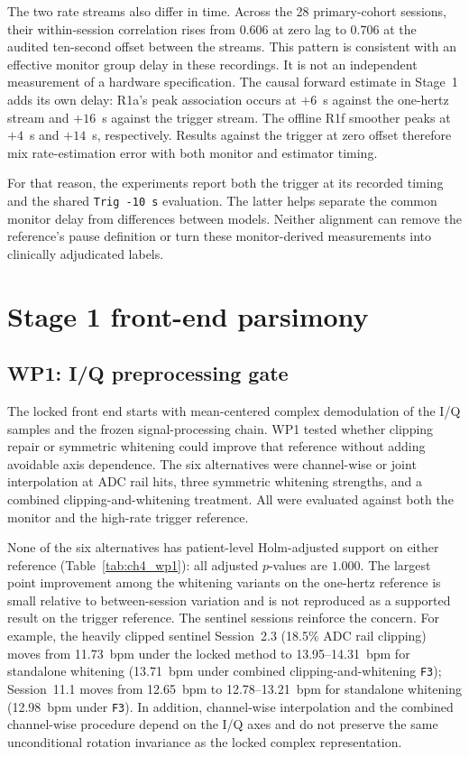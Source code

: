 The two rate streams also differ in time. Across the 28 primary-cohort sessions, their
within-session correlation rises from $0.606$ at zero lag to $0.706$ at the audited ten-second
offset between the streams. This pattern is consistent with an
effective monitor group delay in these recordings. It is not an independent measurement of a
hardware specification. The causal forward estimate in Stage~1 adds its own delay: R1a's peak
association occurs at $+6$~s against the one-hertz stream and $+16$~s against the trigger stream.
The offline R1f smoother peaks at $+4$~s and $+14$~s, respectively. Results against the trigger
at zero offset therefore mix rate-estimation error with both monitor and estimator timing.

For that reason, the experiments report both the trigger at its recorded timing and the shared
\texttt{Trig -10 s} evaluation. The latter helps separate the common monitor delay from differences
between models. Neither alignment can remove the reference's pause definition or turn these
monitor-derived measurements into clinically adjudicated labels.

\section{Stage 1 front-end parsimony}
\label{sec:ch4_frontend_parsimony}

\subsection{WP1: I/Q preprocessing gate}
\label{sec:ch4_wp1}

The locked front end starts with mean-centered complex demodulation of the I/Q samples and the
frozen signal-processing chain. WP1 tested whether clipping repair or symmetric whitening could
improve that reference without adding avoidable axis dependence. The six alternatives were
channel-wise or joint interpolation at ADC rail hits, three symmetric whitening strengths, and a
combined clipping-and-whitening treatment. All were evaluated against both the monitor and the
high-rate trigger reference.

None of the six alternatives has patient-level Holm-adjusted support on either reference
(Table~\ref{tab:ch4_wp1}): all adjusted $p$-values are $1.000$. The largest point improvement
among the whitening variants on the one-hertz reference is small relative to between-session
variation and is not reproduced as a supported result on the trigger reference. The sentinel
sessions reinforce the concern. For example, the heavily clipped sentinel Session~2.3
(18.5\% ADC rail clipping) moves from 11.73~bpm under the locked method to 13.95--14.31~bpm
for standalone whitening (13.71~bpm under combined clipping-and-whitening \texttt{F3});
Session~11.1 moves from 12.65~bpm to 12.78--13.21~bpm for standalone whitening (12.98~bpm under
\texttt{F3}). In addition, channel-wise interpolation and the combined channel-wise
procedure depend on the I/Q axes and do not preserve the same unconditional rotation invariance
as the locked complex representation.

